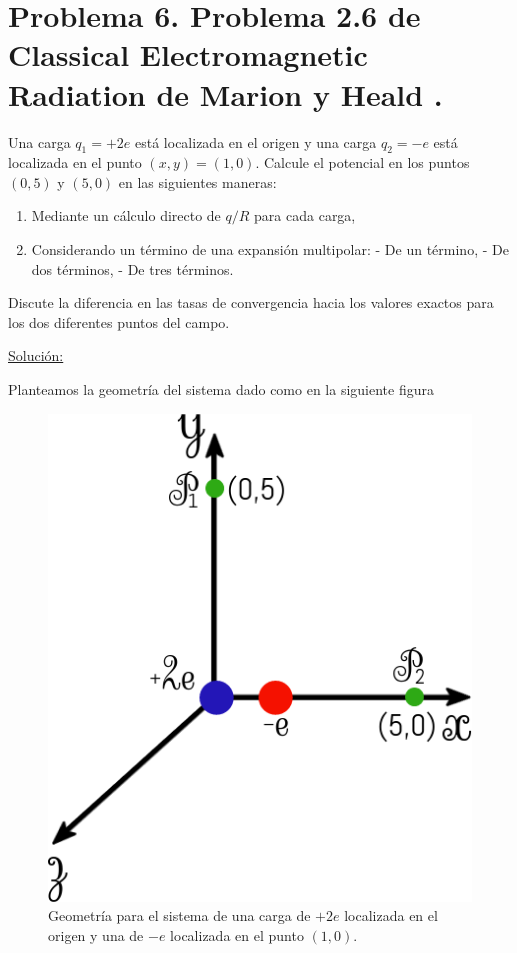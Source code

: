 \documentclass[a4paper,11pt]{article}
\numberwithin{equation}{section}
\begin{document}
\newpage

\section{Problema 6. Problema 2.6 de Classical Electromagnetic Radiation
de Marion y Heald \cite{marion2}.}

Una carga $q_1 = + 2e$ está localizada en el origen y una carga $q_2 = - e$ está 
localizada en el punto $(x,y) = (1,0)$. Calcule el potencial en los puntos $(0,5)$
y $(5,0)$ en las siguientes maneras:

\begin{enumerate}[label=\textbf{(\alph*)}]
\item Mediante un cálculo directo de $q/R$ para cada carga,
\item Considerando un término de una expansión multipolar:
\subitem - De un término,
\subitem - De dos términos,
\subitem - De tres términos.
\end{enumerate}

Discute la diferencia en las tasas de convergencia hacia los valores exactos para 
los dos diferentes puntos del campo.

\vspace{.3cm}

\underline{Solución:} \vspace{.3cm}

Planteamos la geometría del sistema dado como en la siguiente figura

\begin{figure}[H]
 \center 
 \includegraphics[scale=0.4]{problema6fig1}
 \caption{Geometría para el sistema de una carga de $+2e$ localizada en el origen y 
 una de $-e$ localizada en el punto $(1,0)$.}
\end{figure}
\end{document}
